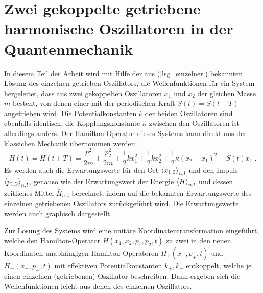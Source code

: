 \chapter{Zwei gekoppelte getriebene harmonische Oszillatoren in der Quantenmechanik}


In diesem Teil der Arbeit wird mit Hilfe der aus (\ref{lsg_einzelner}) bekannten Lösung des einzelnen getrieben Oszillators, die Wellenfunktionen für ein System hergeleitet, dass aus zwei gekoppelten Oszillatoren $x_1$ und $x_2$ der gleichen Masse $m$ besteht, von denen einer mit der periodischen Kraft $S(t) = S(t+T)$ angetrieben wird.
Die Potentialkonstanten $k$ der beiden Oszillatoren sind ebenfalls identisch, die Kopplungskonstante $\kappa$ zwischen den Oszillatoren ist allerdings anders.
Der Hamilton-Operator dieses Systems kann direkt aus der klassichen Mechanik übernommen werden:
\begin{equation}
  H(t) = H(t+T) = \frac{p_1^2}{2m} + \frac{p_2^2}{2m} + \frac 1 2 kx_1^2 + \frac 1 2 kx_2^2 + \frac 1 2 \kappa(x_2-x_1)^2 - S(t)x_1 \; .
  \label{H_gekoppelt}
\end{equation}
Es werden auch die Erwartungswerte für  den Ort $\braket{x_{1,2}}_{n,l}$ und den Impuls $\braket{p_{1,2}}_{n,l}$, genauso wie der Erwartungswert der Energie $\braket{H}_{n,l}$ und dessen zeitliches Mittel $\bar{H}_{n,l}$ berechnet, indem auf die bekannten Erwartungswerte des einzelnen getriebenen Oszillators zurückgeführt wird.
Die Erwartungswerte werden auch graphisch dargestellt.

Zur Lösung des Systems wird eine unitäre Koordinatentransformation eingeführt, welche den Hamilton-Operator $H(x_1,x_2,p_1,p_2,t)$ zu zwei in den neuen Koordinaten unabhängigen Hamilton-Operatoren $H_+(x_+,p_+,t)$ und $H_-(x_-,p_-,t)$ mit effektiven Potentialkonstanten $k_+,k_-$ entkoppelt, welche je einen einzelnen (getriebenen) Oszillator beschreiben.
Dann ergeben sich die Wellenfunktionen leicht aus denen des einzelnen Oszillators.


